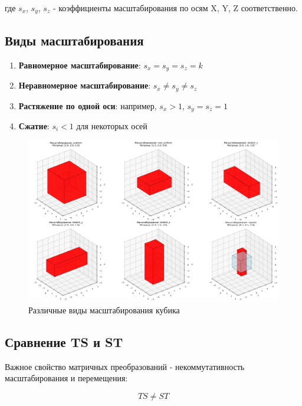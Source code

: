 где $s_x$, $s_y$, $s_z$ - коэффициенты масштабирования по осям X, Y, Z соответственно.

\subsection*{Виды масштабирования}

\begin{enumerate}
\item \textbf{Равномерное масштабирование}: $s_x = s_y = s_z = k$
\item \textbf{Неравномерное масштабирование}: $s_x \neq s_y \neq s_z$
\item \textbf{Растяжение по одной оси}: например, $s_x > 1$, $s_y = s_z = 1$
\item \textbf{Сжатие}: $s_i < 1$ для некоторых осей
\end{enumerate}

\begin{figure}[h]
\centering
\includegraphics[width=\textwidth]{images/task2/scaling_transformations.png}
\caption{Различные виды масштабирования кубика}
\label{fig:scaling_transformations}
\end{figure}

\subsection*{Сравнение TS и ST}

Важное свойство матричных преобразований - некоммутативность масштабирования и перемещения:

\begin{equation}
TS \neq ST
\end{equation}

